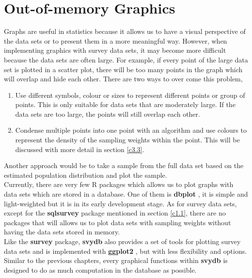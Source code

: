 \graphicspath{{/img}}
\chapter{Out-of-memory Graphics} \label{c3} %

Graphs are useful in statistics because it allows us to have a visual perspective of the data sets or to present them in a more meaningful way. However, when implementing graphics with survey data sets, it may become more difficult because the data sets are often large. For example, if every point of the large data set is plotted in a scatter plot, there will be too many points in the graph which will overlap and hide each other. There are two ways to over come this problem,

\begin{enumerate}
    \item Use different symbols, colour or sizes to represent different points or group of points. This is only suitable for data sets that are moderately large. If the data sets are too large, the points will still overlap each other.
    
    \item Condense multiple points into one point with an algorithm and use colours to represent the density of the sampling weights within the point. This will be discussed with more detail in section \ref{c3.3}.
\end{enumerate}

Another approach would be to take a sample from the full data set based on the estimated population distribution and plot the sample. \\

Currently, there are very few {\sf R} packages which allows us to plot graphs with data sets which are stored in a database. One of them is {\bf dbplot} \citep{dbplotpackage}, it is simple and light-weighted but it is in its early development stage. As for survey data sets, except for the {\bf sqlsurvey} package mentioned in section \ref{c1.1}, there are no packages that will allows us to plot data sets with sampling weights without having the data sets stored in memory.\\

Like the {\bf survey} package, {\bf svydb} also provides a set of tools for plotting survey data sets and is implemented with {\bf ggplot2} \citep{ggplotpackage}, but with less flexibility and options. Similar to the previous chapters, every graphical functions within {\bf svydb} is designed to do as much computation in the database as possible.

